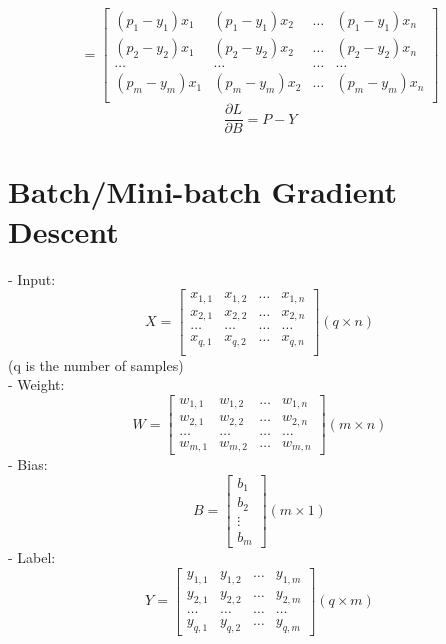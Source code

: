 \documentclass{article}
\begin{document}
    \[
        = \begin{bmatrix}
            (p_1 - y_1)x_1 & (p_1 - y_1)x_2 & \hdots & (p_1 - y_1)x_n \\
            (p_2 - y_2)x_1 & (p_2 - y_2)x_2 & \hdots & (p_2 - y_2)x_n \\
            \hdots & \hdots & \hdots & \hdots \\
            (p_m - y_m)x_1 & (p_m - y_m)x_2 & \hdots & (p_m - y_m)x_n \\
        \end{bmatrix}
    \]
    \[
        \frac{\partial L}{\partial B} = P - Y
    \]
    \section*{Batch/Mini-batch Gradient Descent}
    - Input: 
    \[
        X = \begin{bmatrix}
            x_{1, 1} & x_{1, 2} & \hdots & x_{1, n} \\
            x_{2, 1} & x_{2, 2} & \hdots & x_{2, n} \\
            \hdots & \hdots & \hdots & \hdots \\
            x_{q, 1} & x_{q, 2} & \hdots & x_{q, n} \\
        \end{bmatrix} (q \times n)
    \]
    (q is the number of samples)\\
    - Weight: 
    \[
        W = 
        \begin{bmatrix}
            w_{1, 1} & w_{1, 2} & \hdots & w_{1, n} \\
            w_{2, 1} & w_{2, 2} & \hdots & w_{2, n} \\
            \hdots & \hdots & \hdots & \hdots \\
            w_{m, 1} & w_{m, 2} & \hdots & w_{m, n}
        \end{bmatrix} (m \times n)
    \]
    - Bias: 
    \[
        B = 
        \begin{bmatrix}
            b_1 \\
            b_2 \\
            \vdots \\
            b_m
        \end{bmatrix} (m \times 1)
    \]
    - Label:
    \[
        Y = 
        \begin{bmatrix}
            y_{1, 1} & y_{1, 2} & \hdots & y_{1, m} \\
            y_{2, 1} & y_{2, 2} & \hdots & y_{2, m} \\
            \hdots & \hdots & \hdots & \hdots \\
            y_{q, 1} & y_{q, 2} & \hdots & y_{q, m}
        \end{bmatrix} (q \times m)
    \]
\end{document}

